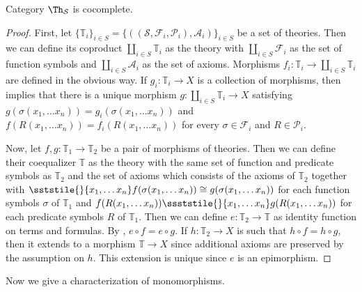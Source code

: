 \begin{prop}[th-cocomplete]
Category $\Th_\mathcal{S}$ is cocomplete.
\end{prop}
\begin{proof}
First, let $\{ \mathbb{T}_i \}_{i \in S} = \{ ((\mathcal{S},\mathcal{F}_i,\mathcal{P}_i),\mathcal{A}_i) \}_{i \in S}$ be a set of theories.
Then we can define its coproduct $\coprod\limits_{i \in S} \mathbb{T}_i$ as the theory with $\coprod\limits_{i \in S} \mathcal{F}_i$ as the set of function symbols and $\coprod\limits_{i \in S} \mathcal{A}_i$ as the set of axioms.
Morphisms $f_i : \mathbb{T}_i \to \coprod\limits_{i \in S} \mathbb{T}_i$ are defined in the obvious way.
If $g_i : \mathbb{T}_i \to X$ is a collection of morphisms, then  implies that there is a unique morphism $g : \coprod\limits_{i \in S} \mathbb{T}_i \to X$
    satisfying $g(\sigma(x_1, \ldots x_n)) = g_i(\sigma(x_1, \ldots x_n))$ and $f(R(x_1, \ldots x_n)) = f_i(R(x_1, \ldots x_n))$
    for every $\sigma \in \mathcal{F}_i$ and $R \in \mathcal{P}_i$.

Now, let $f,g : \mathbb{T}_1 \to \mathbb{T}_2$ be a pair of morphisms of theories.
Then we can define their coequalizer $\mathbb{T}$ as the theory with the same set of function and predicate symbols as $\mathbb{T}_2$ and the set of axioms which consists of the axioms of $\mathbb{T}_2$
together with $\sststile{}{x_1, \ldots x_n} f(\sigma(x_1, \ldots x_n)) \cong g(\sigma(x_1, \ldots x_n))$ for each function symbols $\sigma$ of $\mathbb{T}_1$
and $f(R(x_1, \ldots x_n)) \ssststile{}{x_1, \ldots x_n} g(R(x_1, \ldots x_n))$ for each predicate symbols $R$ of $\mathbb{T}_1$.
Then we can define $e : \mathbb{T}_2 \to \mathbb{T}$ as identity function on terms and formulas.
By , $e \circ f = e \circ g$.
If $h : \mathbb{T}_2 \to X$ is such that $h \circ f = h \circ g$, then it extends to a morphism $\mathbb{T} \to X$ since additional axioms are preserved by the assumption on $h$.
This extension is unique since $e$ is an epimorphism.
\end{proof}

Now we give a characterization of monomorphisms.


